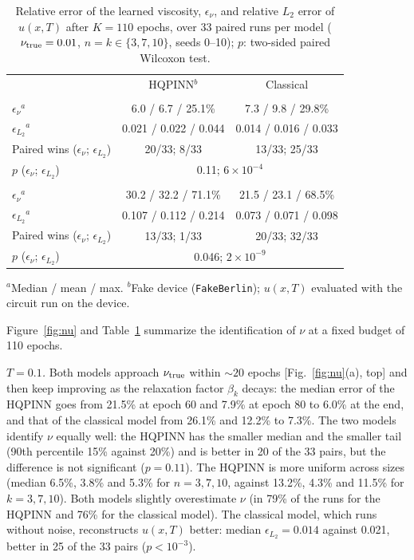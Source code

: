 \documentclass[floatfix,aps,pra,twocolumn,showpacs,superscriptaddress,10pt,nofootinbib]{revtex4-2}
\begin{document}
\begin{table}[b]
\caption{\justifying Relative error of the learned viscosity, $\epsilon_\nu$, and relative $L_2$ error of $u(x,T)$ after $K=110$ epochs, over 33 paired runs per model ($\nu_{\rm true}=0.01$, $n=k\in\{3,7,10\}$, seeds 0--10); $p$: two-sided paired Wilcoxon test.}
\label{tab:prelim}
\setlength{\tabcolsep}{1pt}
\footnotesize
\begin{ruledtabular}
\begin{tabular}{lcc}
 & HQPINN$^{b}$ & Classical\\
\colrule
\multicolumn{3}{c}{$T=0.1$}\\
\colrule
$\epsilon_\nu$$^{a}$ & 6.0 / 6.7 / 25.1\% & 7.3 / 9.8 / 29.8\% \\
$\epsilon_{L_2}$$^{a}$ & 0.021 / 0.022 / 0.044 & 0.014 / 0.016 / 0.033 \\
Paired wins ($\epsilon_\nu$; $\epsilon_{L_2}$) & 20/33; 8/33 & 13/33; 25/33\\
$p$ ($\epsilon_\nu$; $\epsilon_{L_2}$) & \multicolumn{2}{c}{0.11; $6\times10^{-4}$}\\
\colrule
\multicolumn{3}{c}{$T=1$}\\
\colrule
$\epsilon_\nu$$^{a}$ & 30.2 / 32.2 / 71.1\% & 21.5 / 23.1 / 68.5\% \\
$\epsilon_{L_2}$$^{a}$ & 0.107 / 0.112 / 0.214 & 0.073 / 0.071 / 0.098 \\
Paired wins ($\epsilon_\nu$; $\epsilon_{L_2}$) & 13/33; 1/33 & 20/33; 32/33\\
$p$ ($\epsilon_\nu$; $\epsilon_{L_2}$) & \multicolumn{2}{c}{0.046; $2\times10^{-9}$}\\
\end{tabular}
\end{ruledtabular}
\raggedright\footnotesize $^{a}$Median / mean / max. $^{b}$Fake device (\texttt{FakeBerlin}); $u(x,T)$ evaluated with the circuit run on the device.
\end{table}

Figure~\ref{fig:nu} and Table~\ref{tab:prelim} summarize the identification of $\nu$ at a fixed budget of 110 epochs.

\emph{$T=0.1$.} Both models approach $\nu_{\rm true}$ within $\sim20$ epochs [Fig.~\ref{fig:nu}(a), top] and then keep improving as the relaxation factor $\beta_k$ decays: the median error of the HQPINN goes from 21.5\% at epoch 60 and 7.9\% at epoch 80 to 6.0\% at the end, and that of the classical model from 26.1\% and 12.2\% to 7.3\%. The two models identify $\nu$ equally well: the HQPINN has the smaller median and the smaller tail (90th percentile 15\% against 20\%) and is better in 20 of the 33 pairs, but the difference is not significant ($p=0.11$). The HQPINN is more uniform across sizes (median 6.5\%, 3.8\% and 5.3\% for $n=3,7,10$, against 13.2\%, 4.3\% and 11.5\% for $k=3,7,10$). Both models slightly overestimate $\nu$ (in 79\% of the runs for the HQPINN and 76\% for the classical model). The classical model, which runs without noise, reconstructs $u(x,T)$ better: median $\epsilon_{L_2}=0.014$ against 0.021, better in 25 of the 33 pairs ($p<10^{-3}$).
\end{document}
